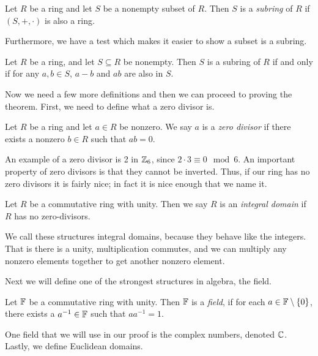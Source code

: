 \documentclass[notitlepage]{simple}
\begin{document}
\begin{definition}[Subring]
	Let $R$ be a ring and let $S$ be a nonempty subset of $R$.
	Then $S$ is a \textit{subring} of $R$ if $(S,+,\cdot)$ is also a ring.
\end{definition}

Furthermore, we have a test which makes it easier to show a subset is a subring.

\begin{proposition}
	Let $R$ be a ring, and let $S\subseteq R$ be nonempty.
	Then $S$ is a subring of $R$ if and only if for any $a,b\in S$, $a-b$ and $ab$ are also in $S$.
\end{proposition}

Now we need a few more definitions and then we can proceed to proving the theorem.
First, we need to define what a zero divisor is.

\begin{definition}
	Let $R$ be a ring and let $a\in R$ be nonzero.
	We say $a$ is a \textit{zero divisor} if there exists a nonzero $b\in R$ such that $ab = 0$.
\end{definition}

An example of a zero divisor is 2 in $\mathbb{Z}_6$, since $2\cdot 3\equiv 0\mod{6}$.
An important property of zero divisors is that they cannot be inverted.
Thus, if our ring has no zero divisors it is fairly nice; in fact it is nice enough that we name it.

\begin{definition}
	Let $R$ be a commutative ring with unity.
	Then we say $R$ is an \textit{integral domain} if $R$ has no zero-divisors.
\end{definition}

We call these structures integral domains, because they behave like the integers.
That is there is a unity, multiplication commutes, and we can multiply any nonzero elements together to get another nonzero element.

Next we will define one of the strongest structures in algebra, the field.

\begin{definition}[Field]
	Let $\mathbb{F}$ be a commutative ring with unity.
	Then $\mathbb{F}$ is a \textit{field}, if for each $a\in\mathbb{F}\setminus\lbrace 0 \rbrace$, there exists a $a^{-1}\in\mathbb{F}$ such that $aa^{-1}=1$.
\end{definition}

One field that we will use in our proof is the complex numbers, denoted $\mathbb{C}$.
Lastly, we define Euclidean domains.
\end{document}
